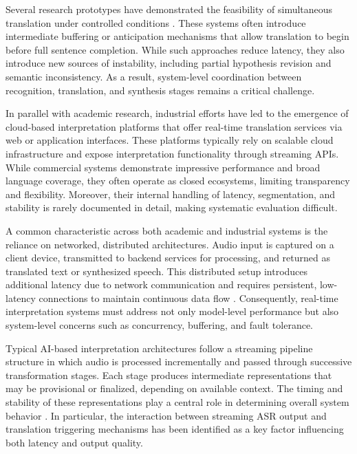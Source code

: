 Several research prototypes have demonstrated the feasibility of simultaneous translation under controlled conditions \cite{cho2016anticipation, weller2021streamingST, popescu-belis2025s2streview}. These systems often introduce intermediate buffering or anticipation mechanisms that allow translation to begin before full sentence completion. While such approaches reduce latency, they also introduce new sources of instability, including partial hypothesis revision and semantic inconsistency. As a result, system-level coordination between recognition, translation, and synthesis stages remains a critical challenge.

In parallel with academic research, industrial efforts have led to the emergence of cloud-based interpretation platforms that offer real-time translation services via web or application interfaces. These platforms typically rely on scalable cloud infrastructure and expose interpretation functionality through streaming APIs. While commercial systems demonstrate impressive performance and broad language coverage, they often operate as closed ecosystems, limiting transparency and flexibility. Moreover, their internal handling of latency, segmentation, and stability is rarely documented in detail, making systematic evaluation difficult.

A common characteristic across both academic and industrial systems is the reliance on networked, distributed architectures. Audio input is captured on a client device, transmitted to backend services for processing, and returned as translated text or synthesized speech. This distributed setup introduces additional latency due to network communication and requires persistent, low-latency connections to maintain continuous data flow \cite{he2019streamingarxiv}. Consequently, real-time interpretation systems must address not only model-level performance but also system-level concerns such as concurrency, buffering, and fault tolerance.

Typical AI-based interpretation architectures follow a streaming pipeline structure in which audio is processed incrementally and passed through successive transformation stages. Each stage produces intermediate representations that may be provisional or finalized, depending on available context. The timing and stability of these representations play a central role in determining overall system behavior \cite{ma2019staclarxiv}. In particular, the interaction between streaming ASR output and translation triggering mechanisms has been identified as a key factor influencing both latency and output quality.

